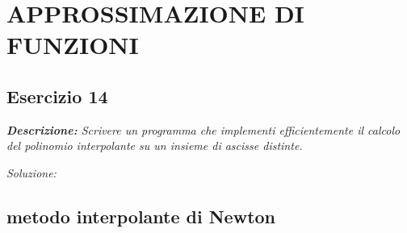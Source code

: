 \chapter{APPROSSIMAZIONE DI FUNZIONI}
\section{Esercizio 14}

\textit{\textbf{Descrizione:} Scrivere un programma che implementi efficientemente il calcolo del polinomio interpolante su un insieme di ascisse distinte.}

\noindent\emph{Soluzione: }

\section*{metodo interpolante di Newton}


\newpage